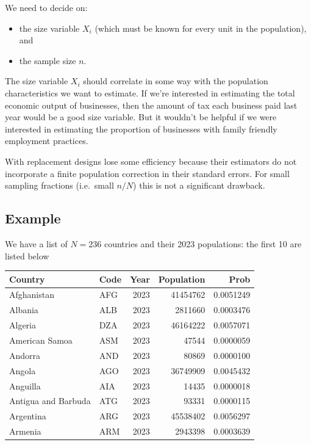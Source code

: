 \documentclass[
]{book}
\providecommand{\tightlist}{%
  \setlength{\itemsep}{0pt}\setlength{\parskip}{0pt}}
\begin{document}
We need to decide on:

\begin{itemize}
\tightlist
\item
  the size variable \(X_i\) (which must be known for every unit in the population), and
\item
  the sample size \(n\).
\end{itemize}

The size variable \(X_i\) should correlate in some way with the population characteristics
we want to estimate. If we're interested in estimating the total economic output of
businesses, then the amount of tax each business paid last year would be a good size
variable. But it wouldn't be helpful if we were interested in estimating the
proportion of businesses with family friendly employment practices.

With replacement designs lose some efficiency because their estimators do not
incorporate a finite population correction in their standard errors.
For small sampling fractions (i.e.~small \(n/N\)) this is not a significant drawback.

\subsection*{Example}\label{example-3}

We have a list of \(N=236\) countries and their 2023 populations:
the first 10 are listed below

\begin{table}
\centering
\begin{tabular}[t]{l|l|r|r|r}
\hline
Country & Code & Year & Population & Prob\\
\hline
Afghanistan & AFG & 2023 & 41454762 & 0.0051249\\
\hline
Albania & ALB & 2023 & 2811660 & 0.0003476\\
\hline
Algeria & DZA & 2023 & 46164222 & 0.0057071\\
\hline
American Samoa & ASM & 2023 & 47544 & 0.0000059\\
\hline
Andorra & AND & 2023 & 80869 & 0.0000100\\
\hline
Angola & AGO & 2023 & 36749909 & 0.0045432\\
\hline
Anguilla & AIA & 2023 & 14435 & 0.0000018\\
\hline
Antigua and Barbuda & ATG & 2023 & 93331 & 0.0000115\\
\hline
Argentina & ARG & 2023 & 45538402 & 0.0056297\\
\hline
Armenia & ARM & 2023 & 2943398 & 0.0003639\\
\hline
\end{tabular}
\end{table}
\end{document}
